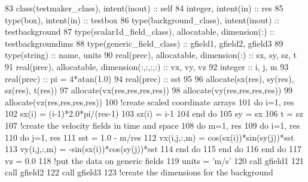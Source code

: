 \begin{DoxyCode}
83     \textcolor{keywordtype}{class}(testmaker\_class), \textcolor{keywordtype}{intent(inout)} :: self
84     \textcolor{keywordtype}{integer}, \textcolor{keywordtype}{intent(in)} :: res
85     \textcolor{keywordtype}{type}(box), \textcolor{keywordtype}{intent(in)} :: testbox
86     \textcolor{keywordtype}{type}(background\_class), \textcolor{keywordtype}{intent(inout)} :: testbackground
87     \textcolor{keywordtype}{type}(scalar1d\_field\_class), \textcolor{keywordtype}{allocatable}, \textcolor{keywordtype}{dimension(:)} :: testbackgroundims
88     \textcolor{keywordtype}{type}(generic\_field\_class) :: gfield1, gfield2, gfield3
89     \textcolor{keywordtype}{type}(string) :: name, units
90     \textcolor{keywordtype}{real(prec)}, \textcolor{keywordtype}{allocatable}, \textcolor{keywordtype}{dimension(:)} :: sx, sy, sz, t
91     \textcolor{keywordtype}{real(prec)}, \textcolor{keywordtype}{allocatable}, \textcolor{keywordtype}{dimension(:,:,:,:)} :: vx, vy, vz
92     \textcolor{keywordtype}{integer} :: i, j, m
93     \textcolor{keywordtype}{real(prec)} :: pi = 4*atan(1.0)
94     \textcolor{keywordtype}{real(prec)} :: sst
95 
96     \textcolor{keyword}{allocate}(sx(res), sy(res), sz(res), t(res))
97     \textcolor{keyword}{allocate}(vx(res,res,res,res))
98     \textcolor{keyword}{allocate}(vy(res,res,res,res))
99     \textcolor{keyword}{allocate}(vz(res,res,res,res))
100     \textcolor{comment}{!create scaled coordinate arrays}
101     \textcolor{keywordflow}{do} i=1, res
102         sx(i) = (i-1)*2.0*pi/(res-1)
103         sz(i) = i-1
104 \textcolor{keywordflow}{    end do}
105     sy = sx
106     t = sz
107     \textcolor{comment}{!create the velocity fields in time and space}
108     \textcolor{keywordflow}{do} m=1, res
109         \textcolor{keywordflow}{do} i=1, res
110             \textcolor{keywordflow}{do} j=1, res
111                 sst = 1.0 - m/res
112                 vx(i,j,:,m) = cos(sx(i))*sin(sy(j))*sst
113                 vy(i,j,:,m) = -sin(sx(i))*cos(sy(j))*sst
114 \textcolor{keywordflow}{            end do}
115 \textcolor{keywordflow}{        end do}
116 \textcolor{keywordflow}{    end do}
117     vz = 0.0
118     \textcolor{comment}{!put the data on generic fields}
119     units = \textcolor{stringliteral}{'m/s'}
120     \textcolor{keyword}{call }gfield1%
121     \textcolor{keyword}{call }gfield2%
122     \textcolor{keyword}{call }gfield3%
123     \textcolor{comment}{!create the dimensions for the background}

\end{DoxyCode}
